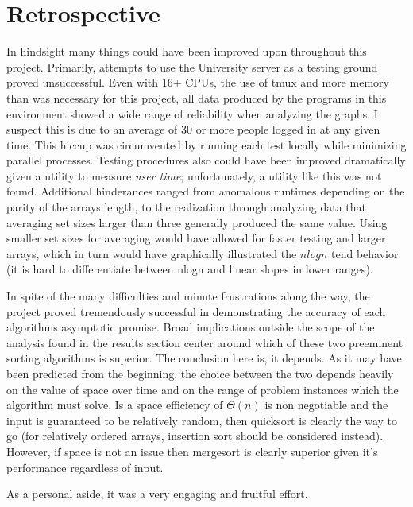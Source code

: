 \documentclass[11pt,letterpaper]{report}
\begin{document}
\section*{Retrospective} %
In hindsight many things could have been improved upon throughout this project. Primarily, attempts to use the University server as a testing ground proved unsuccessful. Even with 16+ CPUs, the use of tmux and more memory than was necessary for this project, all data produced by the programs in this environment showed a wide range of reliability when analyzing the graphs. I suspect this is due to an average of 30 or more people logged in at any given time. This hiccup was circumvented by running each test locally while minimizing parallel processes. Testing procedures also could have been improved dramatically given a utility to measure \emph{user time}; unfortunately, a utility like this was not found. Additional hinderances ranged from anomalous runtimes depending on the parity of the arrays length, to the realization through analyzing data that averaging set sizes larger than three generally produced the same value. Using smaller set sizes for averaging would have allowed for faster testing and larger arrays, which in turn would have graphically illustrated the $nlog{}n$ tend behavior (it is hard to differentiate between nlogn and linear slopes in lower ranges).

In spite of the many difficulties and minute frustrations along the way, the project proved tremendously successful in demonstrating the accuracy of each algorithms asymptotic promise. Broad implications outside the scope of the analysis found in the results section center around which of these two preeminent sorting algorithms is superior. The conclusion here is, it depends. As it may have been predicted from the beginning, the choice between the two depends heavily on the value of space over time and on the range of problem instances which the algorithm must solve. Is a space efficiency of $\Theta(n)$ is non negotiable and the input is guaranteed to be relatively random, then quicksort is clearly the way to go (for relatively ordered arrays, insertion sort should be considered instead). However, if space is not an issue then mergesort is clearly superior given it's performance regardless of input. 

As a personal aside, it was a very engaging and fruitful effort. 
\end{document}
